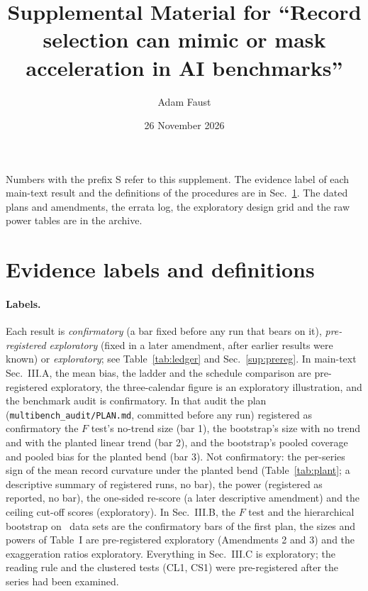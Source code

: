 \documentclass[aps,pre,twocolumn,superscriptaddress,nofootinbib,9pt]{revtex4-2}
\begin{document}
\title{Supplemental Material for ``Record selection can mimic or mask acceleration in AI benchmarks''}

\author{Adam Faust}
\date{26 November 2026}

\maketitle\small

Numbers with the prefix S refer to this supplement. The evidence label of each main-text result and the definitions of the procedures are in Sec.~\ref{sup:labels}. The dated plans and amendments, the errata log, the exploratory design grid and the raw power tables are in the archive.

\section{Evidence labels and definitions}\label{sup:labels}
\paragraph*{Labels.} Each result is \emph{confirmatory} (a bar fixed before any run that bears on it), \emph{pre-registered exploratory} (fixed in a later amendment, after earlier results were known) or \emph{exploratory}; see Table~\ref{tab:ledger} and Sec.~\ref{sup:prereg}. In main-text Sec.~III.A, the mean bias, the ladder and the schedule comparison are pre-registered exploratory, the three-calendar figure is an exploratory illustration, and the benchmark audit is confirmatory. In that audit the plan (\texttt{multibench\_audit/PLAN.md}, committed before any run) registered as confirmatory the $F$ test's no-trend size (bar 1), the bootstrap's size with no trend and with the planted linear trend (bar 2), and the bootstrap's pooled coverage and pooled bias for the planted bend (bar 3). Not confirmatory: the per-series sign of the mean record curvature under the planted bend (Table~\ref{tab:plant}; a descriptive summary of registered runs, no bar), the power (registered as reported, no bar), the one-sided re-score (a later descriptive amendment) and the ceiling cut-off scores (exploratory). In Sec.~III.B, the $F$ test and the hierarchical bootstrap on \origIidN\ data sets are the confirmatory bars of the first plan, the sizes and powers of Table~I are pre-registered exploratory (Amendments 2 and 3) and the exaggeration ratios exploratory. Everything in Sec.~III.C is exploratory; the reading rule and the clustered tests (CL1, CS1) were pre-registered after the series had been examined.
\end{document}
